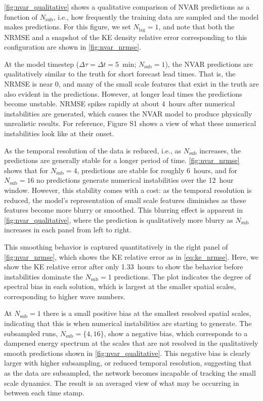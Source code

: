 \documentclass[draft]{agujournal2019}
\newcommand{\maxlag}{N_\text{lag}}
\newcommand{\nsub}{N_\text{sub}}
\newcommand{\nlag}{\maxlag}
\begin{document}
\cref{fig:nvar_qualitative} shows a qualitative comparison of NVAR predictions
as a function of $\nsub$, i.e., how frequently the training data are sampled and
the model makes predictions.
For this figure, we set $\nlag=1$, and note that both the NRMSE and a snapshot
of the KE density relative error corresponding to this configuration are shown in
\cref{fig:nvar_nrmse}.

At the model timestep ($\Delta \tau = \Delta t = 5$~min; $\nsub=1$), the NVAR predictions are
qualitatively similar to the truth for short forecast lead times.
That is, the NRMSE is near 0, and
many of the small scale features that exist in the truth are also evident
in the predictions.
However, at longer lead times the predictions become unstable.
NRMSE spikes rapidly at about 4~hours after numerical instabilities are
generated, which causes the NVAR model to produce physically unrealistic results.
For reference, Figure S1 shows a view of what these
numerical instabilities look like at their onset.

As the temporal resolution of the data is reduced, i.e., as $\nsub$ increases,
the predictions are generally stable for a longer period of time.
\cref{fig:nvar_nrmse} shows that for $\nsub=4$, predictions are stable for roughly
6~hours, and for $\nsub=16$ no predictions generate numerical instabilities over the
12~hour window.
However, this stability comes with a cost: as the temporal resolution is
reduced, the model's representation of small scale features diminishes as these
features become more blurry or smoothed. This blurring effect is apparent in \cref{fig:nvar_qualitative}, where the prediction is qualitatively more blurry as $\nsub$ increases in each panel from left to right.

This smoothing behavior is captured quantitatively in the right panel of
\cref{fig:nvar_nrmse},
which shows the KE relative error as in \cref{eq:ke_nrmse}.
Here, we show the KE relative error after only 1.33~hours to show the behavior
before instabilities dominate the $\nsub=1$ predictions.
The plot indicates the degree of spectral bias in each solution, which is
largest at the smaller spatial scales, corresponding to higher wave numbers.

At $\nsub=1$ there is a small positive bias at the smallest resolved spatial
scales, indicating that this is when numerical instabilities are starting to
generate.
The subsampled runs, $\nsub=\{4,16\}$, show a negative bias, which corresponds
to a dampened energy spectrum at the scales that are not resolved in the
qualitatively smooth predictions shown in \cref{fig:nvar_qualitative}.
This negative bias is clearly larger with higher subsampling, or reduced
temporal resolution, suggesting that as the data are subsampled, the network
becomes incapable of tracking the small scale dynamics.
The result is an averaged view of what may be occurring in
between each time stamp.
\end{document}
